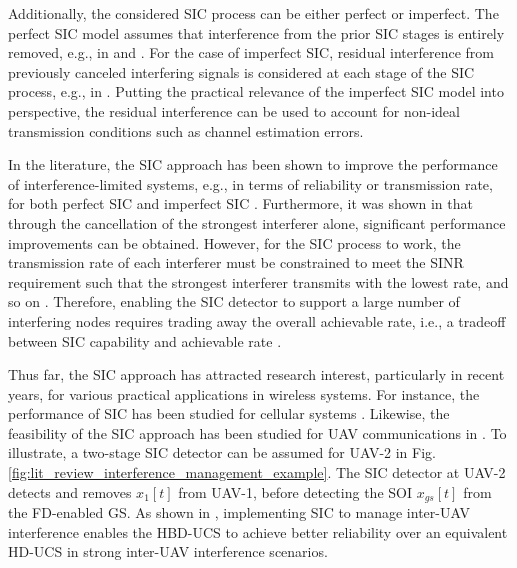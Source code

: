 Additionally, the considered SIC process can be either perfect or imperfect. The perfect SIC model assumes that interference from the prior SIC stages is entirely removed, e.g., in \cite{ernest2019outage} and \cite{weber2007transmission}. For the case of imperfect SIC, residual interference from previously canceled interfering signals is considered at each stage of the SIC process, e.g., in \cite{weber2007transmission, ernest2019hybrid}. Putting the practical relevance of the imperfect SIC model into perspective, the residual interference can be used to account for non-ideal transmission conditions such as channel estimation errors.

In the literature, the SIC approach has been shown to improve the performance of interference-limited systems, e.g., in terms of reliability or transmission rate, for both perfect SIC \cite{ernest2019outage, tan2018joint, weber2007transmission, qu2014understanding} and imperfect SIC \cite{weber2007transmission, ernest2019hybrid}. Furthermore, it was shown in \cite{weber2007transmission} that through the cancellation of the strongest interferer alone, significant performance improvements can be obtained. However, for the SIC process to work, the transmission rate of each interferer must be constrained to meet the SINR requirement such that the strongest interferer transmits with the lowest rate, and so on \cite{qu2014understanding}. Therefore, enabling the SIC detector to support a large number of interfering nodes requires trading away the overall achievable rate, i.e., a tradeoff between SIC capability and achievable rate \cite{qu2014understanding}. 

Thus far, the SIC approach has attracted research interest, particularly in recent years, for various practical applications in wireless systems. For instance, the performance of SIC has been studied for cellular systems \cite{sirigina2016symbol, sirigina2016full, hasna2003performance, zhang2017full}. Likewise, the feasibility of the SIC approach has been studied for UAV communications in \cite{tan2018joint, ernest2019hybrid}. To illustrate, a two-stage SIC detector can be assumed for UAV-2 in Fig. \ref{fig:lit_review_interference_management_example}. The SIC detector at UAV-2 detects and removes $x_1[t]$ from UAV-1, before detecting the SOI $x_{gs}[t]$ from the FD-enabled GS. As shown in \cite{tan2018joint}, implementing SIC to manage inter-UAV interference enables the HBD-UCS to achieve better reliability over an equivalent HD-UCS in strong inter-UAV interference scenarios.

